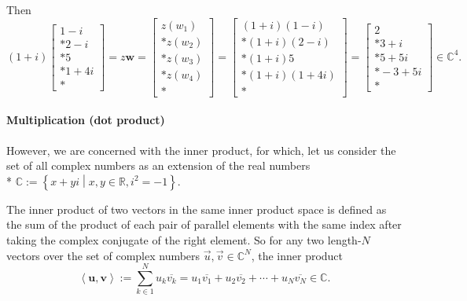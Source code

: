 \documentclass{article}
\begin{document}
Then
\begin{equation}
    (1 + i)\!\left[
        \begin{matrix}
            1 - i \\*
            2 - i \\*
            5 \\*
            1 + 4i \\*
        \end{matrix}
    \right] = z\mathbf{w} = \left[
        \begin{matrix}
            z(w_1) \\*
            z(w_2) \\*
            z(w_3) \\*
            z(w_4) \\*
        \end{matrix}
    \right] = \left[
        \begin{matrix}
            (1 + i)(1 - i) \\*
            (1 + i)(2 - i) \\*
            (1 + i)5 \\*
            (1 + i)(1 + 4i) \\*
        \end{matrix}
    \right] = \left[
        \begin{matrix}
            2 \\*
            3 + i \\*
            5 + 5i \\*
            -3 + 5i \\*
        \end{matrix}
    \right] \in \mathbb{C}^4.
\end{equation}

\paragraph{Multiplication (dot product)}\label{para:vector multiplication}
However, we are concerned with the inner product, for which, let us consider the set of all complex numbers as an extension of the real numbers\\*
$\mathbb{C} := \left\{x+yi \middle| x, y \in \mathbb{R}, i^2 = -1 \right\}$.

The inner product
of two vectors in the same inner product space
is defined as the sum of the product of each pair of parallel elements with the same index after taking the complex conjugate of the right element. 
So for any two length-$N$ vectors over the set of complex numbers $\vec{u}, \vec{v} \in \mathbb{C}^N$, the inner product
\begin{equation}
    \left<\mathbf{u},\mathbf{v}\right> := \sum_{k\in 1}^N u_k\overline{v_k} =
            u_1\overline{v_1} +
            u_2\overline{v_2} +
            \cdots +
            u_N\overline{v_N}
    \in \mathbb{C}.
\end{equation}
\end{document}
